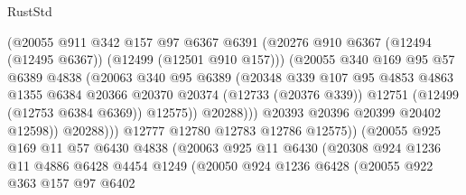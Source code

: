 \begin{lexlean}{RustStd}
\begin{coremodule}
{\begin{coremodule}
{{{{{{{{{{{{{{{{{{{{{{{{{{{{{{{{{{{{{{{{{{{{{{{{{{{{{{{{{{{{{{{{{{{{{{{{{{{{{{{{                            (@20055
                              @911
                              @342
                              @157
                              @97
                              @6367
                              @6391
                              (@20276
                                @910
                                @6367
                                (@12494 (@12495 @6367))
                                (@12499 (@12501 @910 @157)))
                              (@20055
                                @340
                                @169
                                @95
                                @57
                                @6389
                                @4838
                                (@20063
                                  @340
                                  @95
                                  @6389
                                  (@20348
                                    @339
                                    @107
                                    @95
                                    @4853
                                    @4863
                                    @1355
                                    @6384
                                    @20366
                                    @20370
                                    @20374
                                    (@12733 (@20376 @339))
                                    @12751
                                    (@12499 (@12753 @6384 @6369))
                                    @12575))
                                @20288)))
                          @20393
                          @20396
                          @20399
                          @20402
                          @12598))
                      @20288)))
                @12777
                @12780
                @12783
                @12786
                @12575))
            (@20055
              @925
              @169
              @11
              @57
              @6430
              @4838
              (@20063
                @925
                @11
                @6430
                (@20308
                  @924
                  @1236
                  @11
                  @4886
                  @6428
                  @4454
                  @1249
                  (@20050
                    @924
                    @1236
                    @6428
                    (@20055
                      @922
                      @363
                      @157
                      @97
                      @6402
}}}}}}}}}}}}}}}}}}}}}}}}}}}}}}}}}}}}}}}}}}}}}}}}}}}}}}}}}}}}}}}}}}}}}}}}}}}}}}}}
\end{coremodule}}
\end{coremodule}
\end{lexlean}
